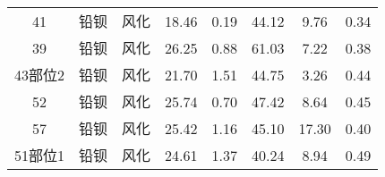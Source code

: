 \documentclass[withoutpreface,bwprint]{cumcmthesis} %
\begin{document}
\begin{appendices}
\begin{table}[!h]
\begin{tabular}{@{}cccccccc@{}}
		41                                                        & 铅钡          & 风化                                                       & 18.46                                                          & 0.19                                                         & 44.12                                                        & 9.76                                                         & 0.34                                                            \\
		39                                                        & 铅钡          & 风化                                                       & 26.25                                                          & 0.88                                                         & 61.03                                                        & 7.22                                                         & 0.38                                                            \\
		43部位2                                                     & 铅钡          & 风化                                                       & 21.70                                                          & 1.51                                                         & 44.75                                                        & 3.26                                                         & 0.44                                                            \\
		52                                                        & 铅钡          & 风化                                                       & 25.74                                                          & 0.70                                                         & 47.42                                                        & 8.64                                                         & 0.45                                                            \\
		57                                                        & 铅钡          & 风化                                                       & 25.42                                                          & 1.16                                                         & 45.10                                                        & 17.30                                                        & 0.40                                                            \\
		51部位1                                                     & 铅钡          & 风化                                                       & 24.61                                                          & 1.37                                                         & 40.24                                                        & 8.94                                                         & 0.49                                                            \\

\end{tabular}
\end{table}
\end{appendices}
\end{document}
